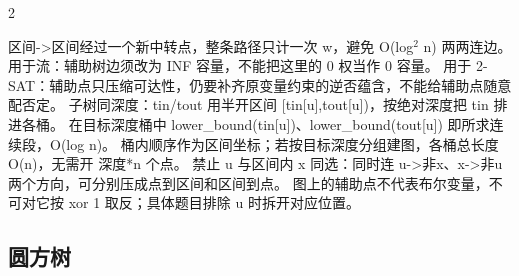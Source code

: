 \documentclass[UTF8,fontset=fandol,a4paper,twoside]{ctexart}
\newcommand{\note}[1]{{\fontsize{10}{12}\selectfont #1\par}}
\begin{document}
\begin{multicols}{2}
\note{区间-\allowbreak{}>\allowbreak{}区间经过一个新中转点，整条路径只计一次 w，避免 O(\allowbreak{}log\ensuremath{^2} n)\allowbreak{} 两两连边。 用于流：辅助树边须改为 INF 容量，不能把这里的 0 权当作 0 容量。 用于 2-\allowbreak{}SAT：辅助点只压缩可达性，仍要补齐原变量约束的逆否蕴含，不能给辅助点随意配否定。 子树同深度：tin/\allowbreak{}tout 用半开区间 [\allowbreak{}tin[\allowbreak{}u]\allowbreak{},\allowbreak{}tout[\allowbreak{}u]\allowbreak{})\allowbreak{}，按绝对深度把 tin 排进各桶。 在目标深度桶中 lower\_bound(\allowbreak{}tin[\allowbreak{}u]\allowbreak{})\allowbreak{}、lower\_bound(\allowbreak{}tout[\allowbreak{}u]\allowbreak{})\allowbreak{} 即所求连续段，O(\allowbreak{}log n)\allowbreak{}。 桶内顺序作为区间坐标；若按目标深度分组建图，各桶总长度 O(\allowbreak{}n)\allowbreak{}，无需开 深度*n 个点。 禁止 u 与区间内 x 同选：同时连 u-\allowbreak{}>\allowbreak{}非x、x-\allowbreak{}>\allowbreak{}非u 两个方向，可分别压成点到区间和区间到点。 图上的辅助点不代表布尔变量，不可对它按 xor 1 取反；具体题目排除 u 时拆开对应位置。}
\subsection{圆方树}


\end{multicols}
\end{document}

